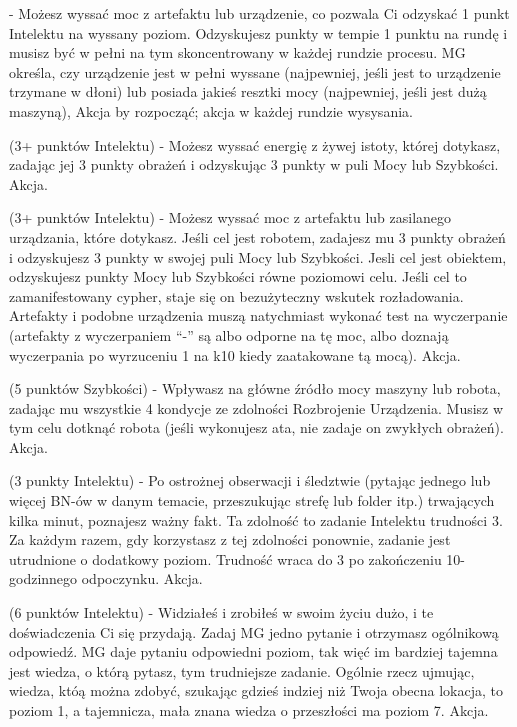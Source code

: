 {   - Możesz wyssać moc z artefaktu lub urządzenie, co pozwala Ci odzyskać 1 punkt Intelektu na wyssany poziom. Odzyskujesz punkty w tempie 1 punktu na rundę i musisz być w pełni na tym skoncentrowany w każdej rundzie procesu. MG określa, czy urządzenie jest w pełni wyssane (najpewniej, jeśli jest to urządzenie trzymane w dłoni) lub posiada jakieś resztki mocy (najpewniej, jeśli jest dużą maszyną), Akcja by rozpocząć; akcja w każdej rundzie wysysania.
 
  (3+ punktów Intelektu) - Możesz wyssać energię z żywej istoty, której dotykasz, zadając jej 3 punkty obrażeń i odzyskując 3 punkty w puli Mocy lub Szybkości. Akcja.
 
  (3+ punktów Intelektu) - Możesz wyssać moc z artefaktu lub zasilanego urządzania, które dotykasz. Jeśli cel jest robotem, zadajesz mu 3 punkty obrażeń i odzyskujesz 3 punkty w swojej puli Mocy lub Szybkości. Jesli cel jest obiektem, odzyskujesz punkty Mocy lub Szybkości równe poziomowi celu. Jeśli cel to zamanifestowany cypher, staje się on bezużyteczny wskutek rozładowania. Artefakty i podobne urządzenia muszą natychmiast wykonać test na wyczerpanie (artefakty z wyczerpaniem ``-'' są albo odporne na tę moc, albo doznają wyczerpania po wyrzuceniu 1 na k10 kiedy zaatakowane tą mocą). Akcja.
 
  (5 punktów Szybkości) - Wpływasz na główne źródło mocy maszyny lub robota, zadając mu wszystkie 4 kondycje ze zdolności Rozbrojenie Urządzenia. Musisz w tym celu dotknąć robota (jeśli wykonujesz ata, nie zadaje on zwykłych obrażeń). Akcja.
 
  (3 punkty Intelektu) - Po ostrożnej obserwacji i śledztwie (pytając jednego lub więcej BN-ów w danym temacie, przeszukując strefę lub folder itp.) trwających kilka minut, poznajesz ważny fakt. Ta zdolność to zadanie Intelektu trudności 3. Za każdym razem, gdy korzystasz z tej zdolności ponownie, zadanie jest utrudnione o dodatkowy poziom. Trudność wraca do 3 po zakończeniu 10-godzinnego odpoczynku. Akcja.
 
  (6 punktów Intelektu) - Widziałeś i zrobiłeś w swoim życiu dużo, i te doświadczenia Ci się przydają. Zadaj MG jedno pytanie i otrzymasz ogólnikową odpowiedź. MG daje pytaniu odpowiedni poziom, tak więć im bardziej tajemna jest wiedza, o którą pytasz, tym trudniejsze zadanie. Ogólnie rzecz ujmując, wiedza, któą można zdobyć, szukając gdzieś indziej niż Twoja obecna lokacja, to poziom 1, a tajemnicza, mała znana wiedza o przeszłości ma poziom 7. Akcja.
 
}

